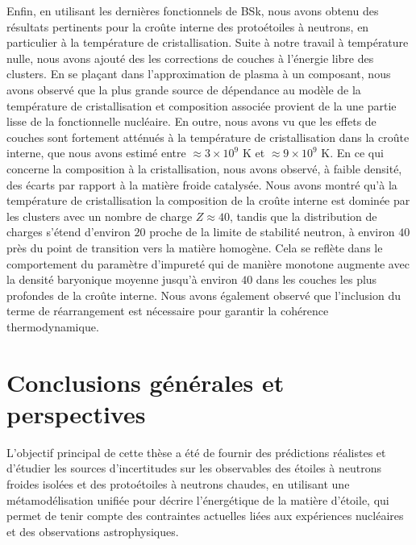 Enfin, en utilisant les dernières fonctionnels de BSk, nous avons obtenu des 
résultats pertinents pour la croûte interne des protoétoiles à neutrons, en 
particulier à la température de cristallisation.
%
Suite à notre travail à température nulle, nous avons ajouté des 
les corrections de couches à l'énergie libre des clusters. En se plaçant 
dans l'approximation de plasma à un composant, nous avons observé que la plus 
grande source de dépendance au modèle de la température de cristallisation et 
composition associée provient de la une partie lisse de la fonctionnelle 
nucléaire. 
En outre, nous avons vu que les effets de couches sont fortement atténués à la 
température de cristallisation dans la croûte interne, que nous avons estimé 
entre $\approx 3 \times 10^9$ K et $\approx 9 \times 10^9$ K. 
En ce qui concerne la composition à la cristallisation, nous avons observé, à 
faible densité, des écarts par rapport à la matière froide catalysée. 
%
Nous avons montré qu'à la 
température de cristallisation la composition de la croûte interne est 
dominée par les clusters avec un nombre de charge $Z\approx 40$, tandis que la 
distribution de charges s'étend d'environ $20$ proche de la limite de stabilité 
neutron, à environ $40$ près du point de transition vers la matière homogène. 
Cela se reflète dans le comportement du paramètre d'impureté qui de manière 
monotone augmente avec la densité baryonique moyenne jusqu'à environ $40$ dans 
les couches les plus profondes de la croûte interne. 
Nous avons également observé que l'inclusion du terme de réarrangement est 
nécessaire pour garantir la cohérence thermodynamique. 

\section{Conclusions générales et perspectives}

L'objectif principal de cette thèse a été de fournir des prédictions réalistes 
et d'étudier les sources d'incertitudes sur les observables des étoiles à 
neutrons froides isolées et des protoétoiles à neutrons chaudes, en utilisant 
une métamodélisation unifiée pour décrire l'énergétique de la matière d'étoile, 
qui permet de tenir compte des contraintes actuelles liées aux expériences 
nucléaires et des observations astrophysiques.
\\

